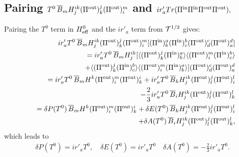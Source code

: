 \documentclass[aps,preprint,floats,epsf,epsfig,nofootinbib,letter]{revtex4}
\newcommand{\be}{\begin{eqnarray}}
\newcommand{\en}{\end{eqnarray}}
\newcommand{\T}{{\cal T}}
\newcommand{\la}{{\langle}}
\newcommand{\ra}{{\rangle}}
\newcommand{\non}{{\nonumber}}
\begin{document}
\subsection{Pairing $T^0\, \overline B_m H^{ik}_j (\Pi^{\rm out})^j_k (\Pi^{\rm out})^m_i$ and $i r'_a Tr(\Pi^{\rm in}\Pi^{\rm in}\Pi^{\rm out}\Pi^{\rm out}),$}
Pairing the $T^0$ term in $H^0_{\rm eff}$ and the $ir'_a$ term from $\T^{1/2}$ gives:
\be
&&
\hspace{-1cm}
 ir'_a  T^0\, \overline B_m H^{ik}_j (\Pi^{\rm out})^j_k (\Pi^{\rm out})^m_i 
[(\Pi^{\rm in})^a_b(\Pi^{\rm in})^b_c(\Pi^{\rm out})^c_d(\Pi^{\rm out})^d_a]
\non\\
&&=ir'_a T^0\, \overline B_m H^{ik}_j 
[\la (\Pi^{\rm out})^j_k (\Pi^{\rm in})^a_b\ra
\la (\Pi^{\rm out})^m_i (\Pi^{\rm in})^b_c\ra
\non\\
&&\quad
+
\la (\Pi^{\rm out})^j_k (\Pi^{\rm in})^b_c\ra
\la (\Pi^{\rm out})^m_i (\Pi^{\rm in})^a_b\ra]
(\Pi^{\rm out})^c_d(\Pi^{\rm out})^d_a
\non\\
&&=ir'_a  T^0\,\overline B_m H^k (\Pi^{\rm out})^m_i (\Pi^{\rm out})^i_k
      +ir'_a  T^0\,\overline B_k H^{ik}_j (\Pi^{\rm out})^j_l (\Pi^{\rm out})^l_i
      \non\\
&&\quad
      -\frac{2}{3}ir'_a T^0\,\overline B_i H^{ik}_j (\Pi^{\rm out})^j_l (\Pi^{\rm out})^l_k
\non\\
&&=\delta P(T^0)\,\overline B_m H^k (\Pi^{\rm out})^m_i (\Pi^{\rm out})^i_k
      +\delta E(T^0)\,\overline B_k H^{ik}_j (\Pi^{\rm out})^j_l (\Pi^{\rm out})^l_i
      \non\\
&&\quad
      +\delta A(T^0)\,\overline B_i H^{ik}_j (\Pi^{\rm out})^j_l (\Pi^{\rm out})^l_k,
\en
which leads to
\be
\delta P(T^0)=ir'_a  T^0,
\quad
\delta E(T^0)=ir'_a  T^0
\quad
\delta A(T^0)=-\frac{2}{3}ir'_a T^0.
\en
\end{document}
